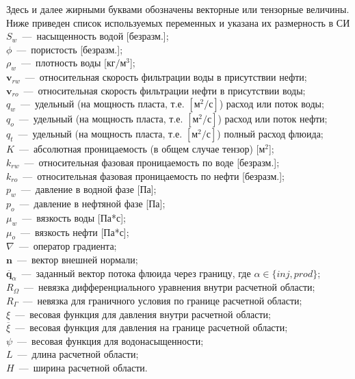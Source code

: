Здесь и далее жирными буквами обозначены векторные или тензорные величины. Ниже приведен список
используемых переменных и указана их размерность в СИ\\
$S_w$~---~насыщенность водой [безразм.];\\
$\phi$~---~пористость [безразм.];\\
$\rho_w$~---~плотность воды [$\text{кг}/\text{м}^3$];\\
$\bm{v}_{rw}$~---~относительная скорость фильтрации воды в присутствии нефти;\\
$\bm{v}_{ro}$~---~относительная скорость фильтрации нефти в присутствии воды;\\
$q_w$~---~удельный (на мощность пласта, т.е. $[\text{м}^2/\text{с}]$) расход или поток воды;\\
$q_o$~---~удельный (на мощность пласта, т.е. $[\text{м}^2/\text{с}]$) расход или поток нефти;\\ 
$q_t$~---~удельный (на мощность пласта, т.е. $[\text{м}^2/\text{с}]$) полный расход флюида;\\ 
$K$~---~абсолютная проницаемость (в общем случае тензор) [$\text{м}^2$];\\
$k_{rw}$~---~относительная фазовая проницаемость по воде [безразм.];\\
$k_{ro}$~---~относительная фазовая проницаемость по нефти [безразм.];\\
$p_w$~---~давление в водной фазе [Па];\\
$p_o$~---~давление в нефтяной фазе [Па];\\
$\mu_w$~---~вязкость воды [Па*с];\\
$\mu_o$~---~вязкость нефти [Па*с];\\
$\nabla$~---~оператор градиента;\\
$\bm{n}$~---~вектор внешней нормали;\\
$\overline{\bm{q}}_\alpha$~---~заданный вектор потока флюида через границу, где $\alpha \in \{inj,prod\}$;\\
$R_\Omega$~---~невязка дифференциального уравнения внутри расчетной области;\\
$R_\Gamma$~---~невязка для граничного условия по границе расчетной области;\\
$\xi$~---~весовая функция для давления внутри расчетной области;\\
$\overline{\xi}$~---~весовая функция для давления на границе расчетной области;\\
$\psi$~---~весовая функция для водонасыщенности;\\
$L$~---~длина расчетной области;\\
$H$~---~ширина расчетной области.

